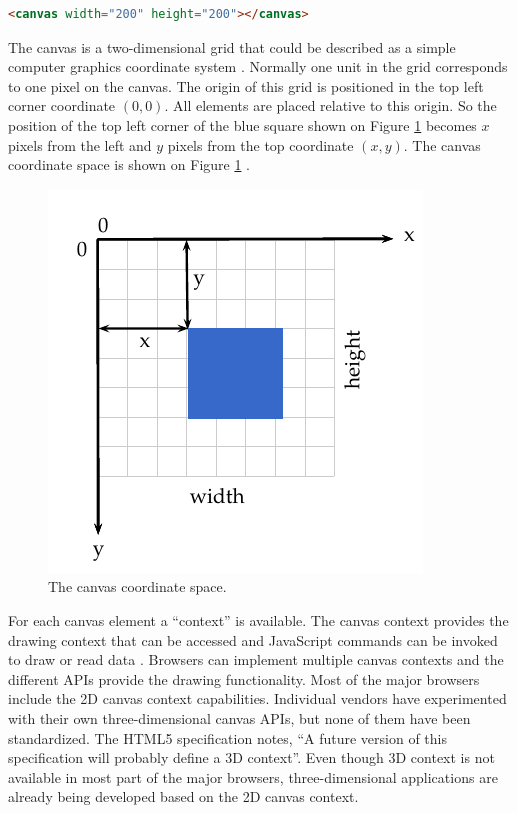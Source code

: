 \begin{lstlisting}[language=HTML,label={lst:canvas_element_markup},caption=The HTML canvas element markup]
<canvas width="200" height="200"></canvas>
\end{lstlisting}

The canvas \cite{Canvas2013} is a two-dimensional grid that could be described as a simple computer graphics coordinate system \cite{Hartley2004}. Normally one unit in the grid corresponds to one pixel on the canvas. The origin of this grid is positioned in the top left corner coordinate $(0,0)$. All elements are placed relative to this origin. So the position of the top left corner of the blue square shown on Figure \ref{figure:canvas_axis} becomes $x$ pixels from the left and $y$ pixels from the top coordinate $(x,y)$. The canvas coordinate space is shown on Figure \ref{figure:canvas_axis} \cite{MDN2013}.

 \begin{figure}[!htb]
   \centering
   \includegraphics{chapters/basic_concepts/canvas_axis.pdf}
   \caption{The canvas coordinate space.}
   \label{figure:canvas_axis}
 \end{figure}

For each canvas element a ``context'' is available. The canvas context provides the drawing context that can be accessed and JavaScript \cite{International2009} commands can be invoked to draw or read data \cite{Canvas2013}. Browsers can implement multiple canvas contexts and the different APIs provide the drawing functionality. Most of the major browsers include the 2D canvas context capabilities. Individual vendors have experimented with their own three-dimensional canvas APIs, but none of them have been standardized. The HTML5 \cite{Hickson2013} specification notes, ``A future version of this specification will probably define a 3D context''. Even though 3D context is not available in most part of the major browsers, three-dimensional applications are already being developed based on the 2D canvas context.

